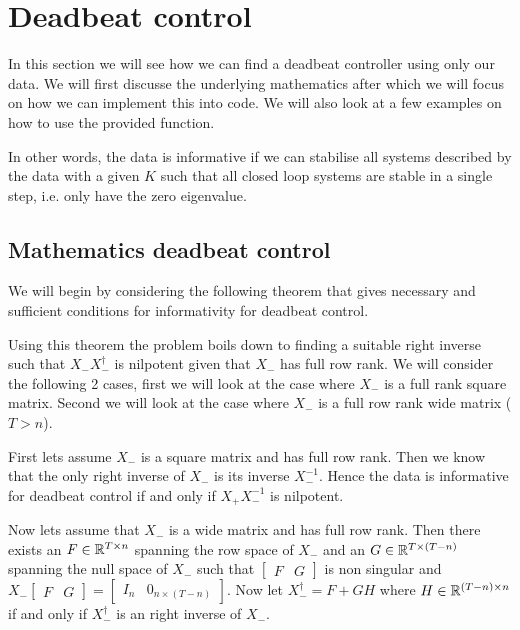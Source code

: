 \section{Deadbeat control}
In this section we will see how we can find a deadbeat controller using only our data. We will first discusse the underlying mathematics after which we will focus on how we can implement this into code. We will also look at a few examples on how to use the provided function.


In other words, the data is informative if we can stabilise all systems described by the data with a given $K$ such that all closed loop systems are stable in a single step, i.e. only have the zero eigenvalue.

\subsection{Mathematics deadbeat control}
We will begin by considering the following theorem that gives necessary and sufficient conditions for informativity for deadbeat control.


Using this theorem the problem boils down to finding a suitable right inverse such that $X_- X_-^\dagger$ is nilpotent given that $X_-$ has full row rank. We will consider the following 2 cases, first we will look at the case where $X_-$ is a full rank square matrix. Second we will look at the case where $X_-$ is a full row rank wide matrix ($T > n$).
 
First lets assume $X_-$ is a square matrix and has full row rank. Then we know that the only right inverse of $X_-$ is its inverse $X_-^{-1}$. Hence the data is informative for deadbeat control if and only if $X_+ X_-^{-1}$ is nilpotent. 

Now lets assume that $X_-$ is a wide matrix and has full row rank. Then there exists an $F \in \mathbb{R}^{T \times n}$ spanning the row space of $X_-$ and an $G \in \mathbb{R}^{T \times (T-n)}$ spanning the null space of $X_-$ such that $\begin{bmatrix}F&G\end{bmatrix}$ is non singular and $X_- \begin{bmatrix}F&G\end{bmatrix} = \begin{bmatrix}I_n&0_{n\times (T-n)}\end{bmatrix}$. Now let $X^\dagger_- = F + G H$ where $H \in \mathbb{R}^{(T-n) \times n}$ if and only if $X_-^\dagger$ is an right inverse of $X_-$.

